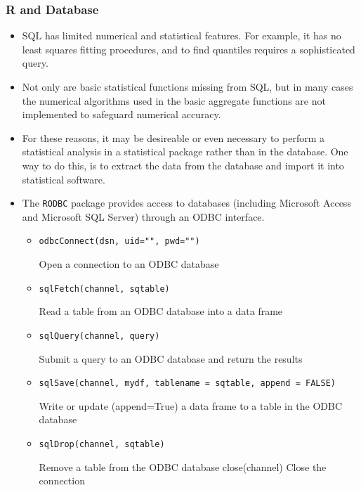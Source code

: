 \documentclass[10pt]{beamer}
\begin{document}
\begin{frame}
  \frametitle{R and Database}
  \begin{itemize}

  \item SQL has limited numerical and statistical features. For example, it has no least
    squares fitting procedures, and to find quantiles requires a sophisticated query.

  \item Not only are basic statistical functions missing from SQL, but in many cases the
    numerical algorithms used in the basic aggregate functions are not implemented to
    safeguard numerical accuracy.

  \item For these reasons, it may be desireable or even necessary to perform a statistical
    analysis in a statistical package rather than in the database. One way to do this, is
    to extract the data from the database and import it into statistical software.

  \item The \texttt{RODBC} package provides access to databases (including Microsoft
    Access and Microsoft SQL Server) through an ODBC interface.

    \begin{itemize}
    \item \texttt{odbcConnect(dsn, uid="", pwd="")}

      Open a connection to an ODBC database

    \item \texttt{sqlFetch(channel, sqtable)}

      Read a table from an ODBC database into a data frame

    \item \texttt{sqlQuery(channel, query)}

      Submit a query to an ODBC database and return the results

    \item \texttt{sqlSave(channel, mydf, tablename = sqtable, append = FALSE)}

      Write or update (append=True) a data frame to a table in the ODBC database

    \item \texttt{sqlDrop(channel, sqtable)}

      Remove a table from the ODBC database close(channel) Close the connection

    \end{itemize}


\end{itemize}
\end{frame}
\end{document}
